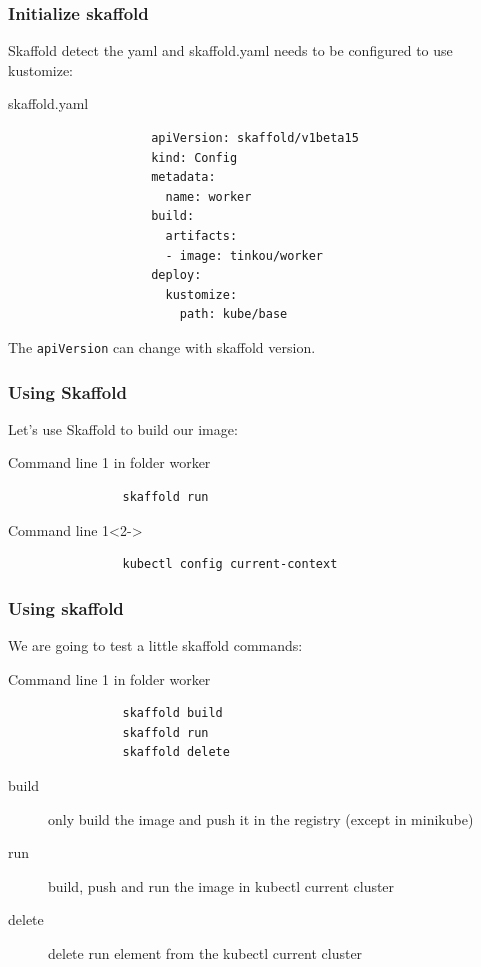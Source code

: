 	\begin{frame}[fragile]
		\frametitle{Initialize skaffold}

		Skaffold detect the yaml and skaffold.yaml needs to be configured to use kustomize:
		\begin{block}{skaffold.yaml}
			\begin{footnotesize}
				\begin{verbatim}
					apiVersion: skaffold/v1beta15
					kind: Config
					metadata:
					  name: worker
					build:
					  artifacts:
					  - image: tinkou/worker
					deploy:
					  kustomize:
					    path: kube/base
				\end{verbatim}						
			\end{footnotesize}
		\end{block}
		The \verb!apiVersion! can change with skaffold version.
	\end{frame}
	
	\begin{frame}[fragile]
		\frametitle{Using Skaffold}
		
		Let's use Skaffold to build our image:
		\begin{block}{Command line 1 in folder worker}
			\begin{verbatim}
				skaffold run
			\end{verbatim}
		\end{block}
		
		\bigskip
		

		\begin{block}{Command line 1}<2->
			\begin{verbatim}
				kubectl config current-context
			\end{verbatim}
		\end{block}				
	\end{frame}
	
	\begin{frame}[fragile]
		\frametitle{Using skaffold}
		
		We are going to test a little skaffold commands:
		\begin{block}{Command line 1 in folder worker}
			\begin{verbatim}
				skaffold build
				skaffold run
				skaffold delete
			\end{verbatim}					
		\end{block}
		
		\begin{description}
			\item[build] only build the image and push it in the registry (except in minikube)
			\item[run] build, push and run the image in kubectl current cluster
			\item[delete] delete run element from the kubectl current cluster
		\end{description}
	
	\end{frame}
	
